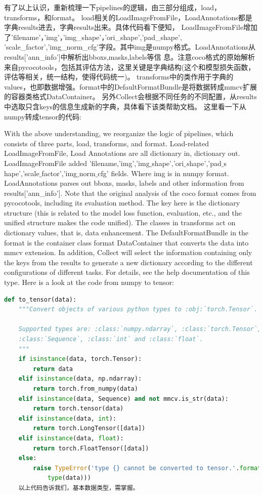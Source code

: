 \documentclass[UTF8]{ctexart}
\begin{document}
有了以上认识，重新梳理一下pipelines的逻辑，由三部分组成，load，transforms，和format。
load相关的LoadImageFromFile，LoadAnnotations都是字典results进去，字典results出来。具体代码看下便知，
LoadImageFromFile增加了'filename'，'img'，'img\_shape'，'ori\_shape','pad\_shape',
'scale\_factor','img\_norm\_cfg'字段。其中img是numpy格式。LoadAnnotations从results['ann\_info']中解析出bboxs,masks,labels等信
息。注意coco格式的原始解析来自pycocotools，包括其评估方法，这里关键是字典结构(这个和模型损失函数，评估等相关，统一结构，使得代码统一)。
transforms中的类作用于字典的values，也即数据增强。format中的DefaultFormatBundle是将数据转成mmcv扩展的容器类格式DataContainer。
另外Collect会根据不同任务的不同配置，从results中选取只含keys的信息生成新的字典，具体看下该类帮助文档。
这里看一下从numpy转成tensor的代码:

With the above understanding, we reorganize the logic of pipelines, which consists of three parts, load, transforms, 
and format. Load-related LoadImageFromFile, Load Annotations are all dictionary in, dictionary out. LoadImageFromFile 
added 'filename,'img','img$\_$shape','ori$\_s$hape','pad$\_$s \newline
hape','scale$\_$factor','img$\_$norm$\_$cfg' fields. 
Where img is in numpy format. LoadAnnotations parses out bboxs, masks, labels and other information from results['ann\_info'].
Note that the original analysis of the coco format comes from pycocotools, including its evaluation method. The key here is 
the dictionary structure (this is related to the model loss function, evaluation, etc., and the unified structure makes the 
code unified). The classes in transforms act on dictionary values, that is, data enhancement. The DefaultFormatBundle in the 
format is the container class format DataContainer that converts the data into mmcv extension. In addition, Collect will select 
the information containing only the keys from the results to generate a new dictionary according to the different configurations 
of different tasks. For details, see the help documentation of this type. Here is a look at the code from numpy to tensor:

\lstset{style=mystyle}
\begin{lstlisting}[language=Python]
def to_tensor(data):
    """Convert objects of various python types to :obj:`torch.Tensor`.

    Supported types are: :class:`numpy.ndarray`, :class:`torch.Tensor`,
    :class:`Sequence`, :class:`int` and :class:`float`.
    """
    if isinstance(data, torch.Tensor):
        return data
    elif isinstance(data, np.ndarray):
        return torch.from_numpy(data)
    elif isinstance(data, Sequence) and not mmcv.is_str(data):
        return torch.tensor(data)
    elif isinstance(data, int):
        return torch.LongTensor([data])
    elif isinstance(data, float):
        return torch.FloatTensor([data])
    else:
        raise TypeError('type {} cannot be converted to tensor.'.format(
			type(data)))
	以上代码告诉我们，基本数据类型，需掌握。
\end{lstlisting}
\end{document}

